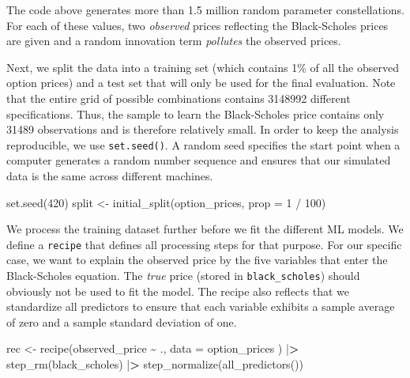 \documentclass[
]{krantz}
\newenvironment{Shaded}{\begin{snugshade}}{\end{snugshade}}
\newcommand{\AttributeTok}[1]{\textcolor[rgb]{0.61,0.61,0.61}{#1}}
\newcommand{\DecValTok}[1]{\textcolor[rgb]{0.06,0.06,0.06}{#1}}
\newcommand{\ErrorTok}[1]{\textcolor[rgb]{0.14,0.14,0.14}{\textbf{#1}}}
\newcommand{\FunctionTok}[1]{\textcolor[rgb]{0,0,0}{#1}}
\newcommand{\NormalTok}[1]{#1}
\newcommand{\OtherTok}[1]{\textcolor[rgb]{0.37,0.37,0.37}{#1}}
\newcommand{\SpecialCharTok}[1]{\textcolor[rgb]{0,0,0}{#1}}
\begin{document}
The code above generates more than 1.5 million random parameter constellations. For each of these values, two \emph{observed} prices reflecting the Black-Scholes prices are given and a random innovation term \emph{pollutes} the observed prices.

Next, we split the data into a training set (which contains 1\% of all the observed option prices) and a test set that will only be used for the final evaluation. Note that the entire grid of possible combinations contains 3148992 different specifications. Thus, the sample to learn the Black-Scholes price contains only 31489 observations and is therefore relatively small.
In order to keep the analysis reproducible, we use \texttt{set.seed()}. A random seed specifies the start point when a computer generates a random number sequence and ensures that our simulated data is the same across different machines.

\begin{Shaded}
\begin{Highlighting}[]
\FunctionTok{set.seed}\NormalTok{(}\DecValTok{420}\NormalTok{)}
\NormalTok{split }\OtherTok{\textless{}{-}} \FunctionTok{initial\_split}\NormalTok{(option\_prices, }\AttributeTok{prop =} \DecValTok{1} \SpecialCharTok{/} \DecValTok{100}\NormalTok{)}
\end{Highlighting}
\end{Shaded}

We process the training dataset further before we fit the different ML models. We define a \texttt{recipe} that defines all processing steps for that purpose. For our specific case, we want to explain the observed price by the five variables that enter the Black-Scholes equation. The \emph{true} price (stored in \texttt{black\_scholes}) should obviously not be used to fit the model. The recipe also reflects that we standardize all predictors to ensure that each variable exhibits a sample average of zero and a sample standard deviation of one.

\begin{Shaded}
\begin{Highlighting}[]
\NormalTok{rec }\OtherTok{\textless{}{-}} \FunctionTok{recipe}\NormalTok{(observed\_price }\SpecialCharTok{\textasciitilde{}}\NormalTok{ .,}
  \AttributeTok{data =}\NormalTok{ option\_prices}
\NormalTok{) }\SpecialCharTok{|}\ErrorTok{\textgreater{}}
  \FunctionTok{step\_rm}\NormalTok{(black\_scholes) }\SpecialCharTok{|}\ErrorTok{\textgreater{}}
  \FunctionTok{step\_normalize}\NormalTok{(}\FunctionTok{all\_predictors}\NormalTok{())}
\end{Highlighting}
\end{Shaded}
\end{document}

